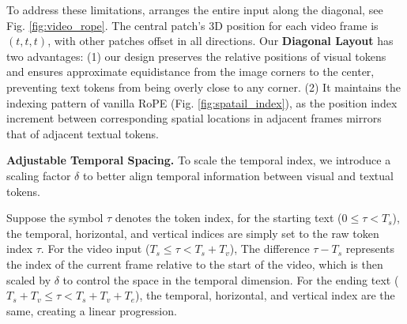 To address these limitations, \methodname arranges the entire input along the diagonal, see Fig. \ref{fig:video_rope}.
The central patch's 3D position for each video frame is $(t,t,t)$, with other patches offset in all directions.
Our \textbf{Diagonal Layout} has two advantages: (1) our design preserves the relative positions of visual tokens and ensures approximate equidistance from the image corners to the center, preventing text tokens from being overly close to any corner. (2) It maintains the indexing pattern of vanilla RoPE (Fig.  \ref{fig:spatail_index}), as the position index increment between corresponding spatial locations in adjacent frames mirrors that of adjacent textual tokens.

\noindent \textbf{Adjustable Temporal Spacing.}
To scale the temporal index, we introduce a scaling factor $\delta$ to better align temporal information between visual and textual tokens.

Suppose the symbol $\tau$ denotes the token index, for the starting text ($0 \leq \tau < T_s$), the temporal, horizontal, and vertical indices are simply set to the raw token index $\tau$.
For the video input ($T_s \leq \tau < T_s + T_v$), The difference $\tau - T_s$ represents the index of the current frame relative to the start of the video, which is then scaled by $\delta$ to control the space in the temporal dimension.
For the ending text ($T_s + T_v \leq \tau < T_s + T_v + T_e$), the temporal, horizontal, and vertical index are the same, creating a linear progression.

